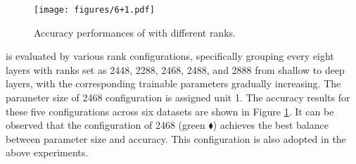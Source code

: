 \begin{figure}
    \centering
    \texttt{[image: figures/6+1.pdf]}
    \caption{Accuracy performances of \name with different ranks.}\label{fig:rank_config}
    \vspace{-5pt}
\end{figure}

\name is evaluated by various rank configurations, specifically grouping every eight layers with ranks set as 2448, 2288, 2468, 2488, and 2888 from shallow to deep layers, with the corresponding trainable parameters gradually increasing. The parameter size of 2468 configuration is assigned unit 1. The accuracy results for these five configurations across six datasets are shown in Figure \ref{fig:rank_config}. It can be observed that the configuration of 2468 (green $\blacklozenge$) achieves the best balance between parameter size and accuracy. This configuration is also adopted in the above experiments.